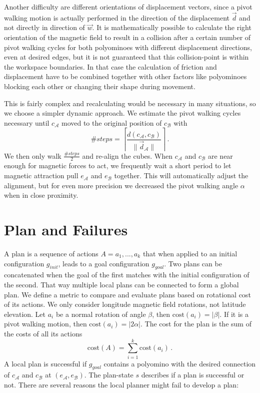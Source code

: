 Another difficulty are different orientations of displacement vectors, since a pivot walking motion is actually performed in the direction of the displacement $\vec{d}$ and not directly in direction of $\vec{w}$.
It is mathematically possible to calculate the right orientation of the magnetic field to result in a collision after a certain number of pivot walking cycles for both polyominoes with different displacement directions, even at desired edges, but it is not guaranteed that this collision-point is within the workspace boundaries.
In that case the calculation of friction and displacement have to be combined together with other factors like polyominoes blocking each other or changing their shape during movement.

This is fairly complex and recalculating would be necessary in many situations, so we choose a simpler dynamic approach.
We estimate the pivot walking cycles necessary until $c_\mathcal{A}$ moved to the original position of $c_\mathcal{B}$ with
\begin{equation}
\#\textit{steps} = \left\lceil \frac{d(c_\mathcal{A}, c_\mathcal{B})}{\lVert \vec{d}_\mathcal{A} \rVert} \right\rceil \,.
\end{equation}
We then only walk $\frac{\#\textit{steps}}{2}$ and re-align the cubes.
When $c_\mathcal{A}$ and $c_\mathcal{B}$ are near enough for magnetic forces to act, we frequently wait a short period to let magnetic attraction pull $e_\mathcal{A}$ and $e_\mathcal{B}$ together.
This will automatically adjust the alignment, but for even more precision we decreased the pivot walking angle $\alpha$ when in close proximity.

\section{Plan and Failures}
\label{sec:plan}

A plan is a sequence of actions $A = a_1, ... , a_k$ that when applied to an initial configuration $g_\textit{init}$, leads to a goal configuration $g_\textit{goal}$.
Two plans can be concatenated when the goal of the first matches with the initial configuration of the second.
That way multiple local plans can be connected to form a global plan.
We define a metric to compare and evaluate plans based on rotational cost of its actions.
We only consider longitude magnetic field rotations, not latitude elevation.
Let $a_i$ be a normal rotation of angle $\beta$, then $\text{cost}(a_i) = |\beta|$.
If it is a pivot walking motion, then $\text{cost}(a_i) = |2\alpha|$.
The cost for the plan is the sum of the costs of all its actions
\begin{equation}
\text{cost}(A) = \sum_{i=1}^{k} \text{cost}(a_i) \,.
\end{equation}
A local plan is successful if $g_\textit{goal}$ contains a polyomino with the desired connection of $c_\mathcal{A}$ and $c_\mathcal{B}$ at $(e_\mathcal{A}, e_\mathcal{B})$.
The plan-state $s$ describes if a plan is successful or not.
There are several reasons the local planner might fail to develop a plan:

